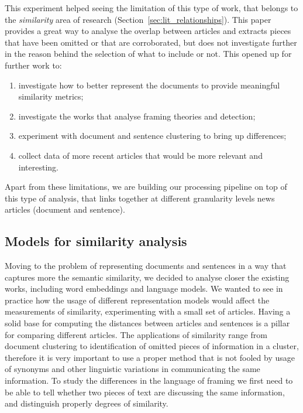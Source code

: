 

This experiment helped seeing the limitation of this type of work, that belongs to the \emph{similarity} area of research (Section~\ref{sec:lit_relationships}).
This paper provides a great way to analyse the overlap between articles and extracts pieces that have been omitted or that are corroborated, but does not investigate further in the reason behind the selection of what to include or not.
This opened up for further work to:
\begin{enumerate}
    \item investigate how to better represent the documents to provide meaningful similarity metrics;
    \item investigate the works that analyse framing theories and detection;
    \item experiment with document and sentence clustering to bring up differences;
    \item collect data of more recent articles that would be more relevant and interesting.
\end{enumerate}

Apart from these limitations, we are building our processing pipeline on top of this type of analysis, that links together at different granularity levels news articles (document and sentence).


\subsection{Models for similarity analysis}
Moving to the problem of representing documents and sentences in a way that captures more the semantic similarity, we decided to analyse closer the existing works, including word embeddings and language models.
We wanted to see in practice how the usage of different representation models would affect the measurements of similarity, experimenting with a small set of articles. 
Having a solid base for computing the distances between articles and sentences is a pillar for comparing different articles. The applications of similarity range from document clustering to identification of omitted pieces of information in a cluster, therefore it is very important to use a proper method that is not fooled by usage of synonyms and other linguistic variations in communicating the same information. To study the differences in the language of framing we first need to be able to tell whether two pieces of text are discussing the same information, and distinguish properly degrees of similarity.

